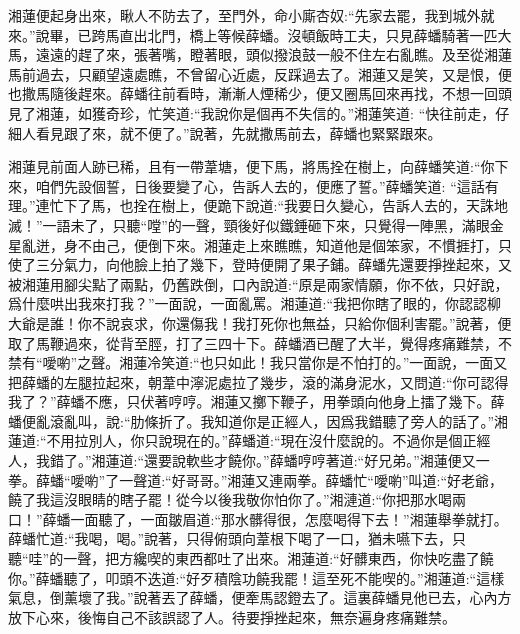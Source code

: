 \begin{parag}
    湘蓮便起身出來，瞅人不防去了，至門外，命小廝杏奴:“先家去罷，我到城外就來。”說畢，已跨馬直出北門，橋上等候薛蟠。沒頓飯時工夫，只見薛蟠騎著一匹大馬，遠遠的趕了來，張著嘴，瞪著眼，頭似撥浪鼓一般不住左右亂瞧。及至從湘蓮馬前過去，只顧望遠處瞧，不曾留心近處，反踩過去了。湘蓮又是笑，又是恨，便也撒馬隨後趕來。薛蟠往前看時，漸漸人煙稀少，便又圈馬回來再找，不想一回頭見了湘蓮，如獲奇珍，忙笑道:“我說你是個再不失信的。”湘蓮笑道: “快往前走，仔細人看見跟了來，就不便了。”說著，先就撒馬前去，薛蟠也緊緊跟來。
\end{parag}


\begin{parag}
    湘蓮見前面人跡已稀，且有一帶葦塘，便下馬，將馬拴在樹上，向薛蟠笑道:“你下來，咱們先設個誓，日後要變了心，告訴人去的，便應了誓。”薛蟠笑道: “這話有理。”連忙下了馬，也拴在樹上，便跪下說道:“我要日久變心，告訴人去的，天誅地滅！”一語未了，只聽“嘡”的一聲，頸後好似鐵錘砸下來，只覺得一陣黑，滿眼金星亂迸，身不由己，便倒下來。湘蓮走上來瞧瞧，知道他是個笨家，不慣捱打，只使了三分氣力，向他臉上拍了幾下，登時便開了果子鋪。薛蟠先還要掙挫起來，又被湘蓮用腳尖點了兩點，仍舊跌倒，口內說道:“原是兩家情願，你不依，只好說，爲什麼哄出我來打我？”一面說，一面亂罵。湘蓮道:“我把你瞎了眼的，你認認柳大爺是誰！你不說哀求，你還傷我！我打死你也無益，只給你個利害罷。”說著，便取了馬鞭過來，從背至脛，打了三四十下。薛蟠酒已醒了大半，覺得疼痛難禁，不禁有“噯喲”之聲。湘蓮冷笑道:“也只如此！我只當你是不怕打的。”一面說，一面又把薛蟠的左腿拉起來，朝葦中濘泥處拉了幾步，滾的滿身泥水，又問道:“你可認得我了？”薛蟠不應，只伏著哼哼。湘蓮又擲下鞭子，用拳頭向他身上擂了幾下。薛蟠便亂滾亂叫，說:“肋條折了。我知道你是正經人，因爲我錯聽了旁人的話了。”湘蓮道:“不用拉別人，你只說現在的。”薛蟠道:“現在沒什麼說的。不過你是個正經人，我錯了。”湘蓮道:“還要說軟些才饒你。”薛蟠哼哼著道:“好兄弟。”湘蓮便又一拳。薛蟠“噯喲”了一聲道:“好哥哥。”湘蓮又連兩拳。薛蟠忙“噯喲”叫道:“好老爺，饒了我這沒眼睛的瞎子罷！從今以後我敬你怕你了。”湘漣道:“你把那水喝兩口！”薛蟠一面聽了，一面皺眉道:“那水髒得很，怎麼喝得下去！”湘蓮舉拳就打。薛蟠忙道:“我喝，喝。”說著，只得俯頭向葦根下喝了一口，猶未嚥下去，只聽“哇”的一聲，把方纔喫的東西都吐了出來。湘蓮道:“好髒東西，你快吃盡了饒你。”薛蟠聽了，叩頭不迭道:“好歹積陰功饒我罷！這至死不能喫的。”湘蓮道:“這樣氣息，倒薰壞了我。”說著丟了薛蟠，便牽馬認鐙去了。這裏薛蟠見他已去，心內方放下心來，後悔自己不該誤認了人。待要掙挫起來，無奈遍身疼痛難禁。
\end{parag}


